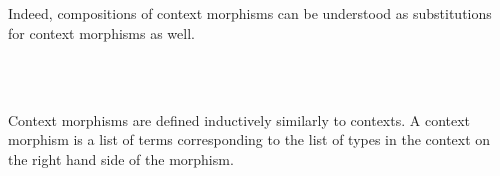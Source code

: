\begin{code}\>\<%
\\
\> \<[8]%
\>[8]\AgdaSymbol{:}  \AgdaSymbol{\}}          \<%
\\
\> \<[8]%
\>[8]\AgdaSymbol{:}   \AgdaSymbol{\}}     \AgdaSymbol{(} \AgdaSymbol{:}   \AgdaSymbol{)}   \AgdaSymbol{(} \AgdaFunction{[}  \AgdaFunction{]T}\AgdaSymbol{)}\<%
\\
\> \<[8]%
\>[8]\AgdaSymbol{:}   \AgdaSymbol{\}}     \AgdaSymbol{(} \AgdaSymbol{:}   \AgdaSymbol{)}   \AgdaSymbol{(} \AgdaFunction{[}  \AgdaFunction{]T}\AgdaSymbol{)} \<[59]%
\>[59]\<%
\\
\>\<\end{code}
Indeed, compositions of context morphisms can be understood as substitutions for context morphisms as well.

\begin{code}\>\<%
\\
\> \AgdaSymbol{:}   \AgdaSymbol{\}}      \AgdaSymbol{(} \AgdaSymbol{:}   \AgdaSymbol{)}     \<[47]%
\>[47]\<%
\\
\>\<\end{code}
Context morphisms are defined inductively similarly to contexts. A context morphism is a list of terms corresponding to the list of types in the context on the right hand side of the morphism.

